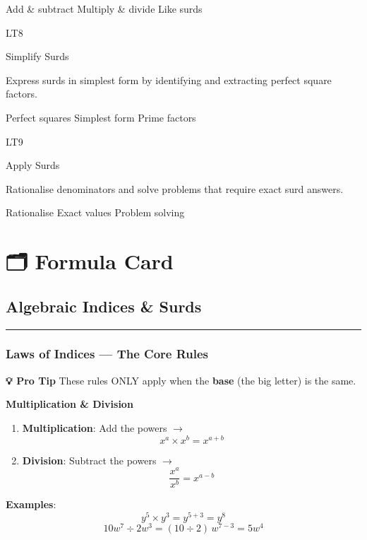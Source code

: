 \documentclass[
  letterpaper,
  DIV=11,
  numbers=noendperiod]{scrreprt}
\providecommand{\tightlist}{%
  \setlength{\itemsep}{0pt}\setlength{\parskip}{0pt}}
\theoremstyle{definition}
\theoremstyle{remark}
\begin{document}
{Add \& subtract} {Multiply \& divide} {Like surds}

LT8

Simplify Surds

Express surds in simplest form by identifying and extracting perfect
square factors.

{Perfect squares} {Simplest form} {Prime factors}

LT9

Apply Surds

Rationalise denominators and solve problems that require exact surd
answers.

{Rationalise} {Exact values} {Problem solving}

\section{🗂️ Formula Card}\label{formula-card}

\subsection*{Algebraic Indices \& Surds}\label{algebraic-indices-surds}

\begin{center}\rule{0.5\linewidth}{0.5pt}\end{center}

\subsubsection*{Laws of Indices --- The Core
Rules}\label{laws-of-indices-the-core-rules}

\textbf{💡 Pro Tip} These rules ONLY apply when the \textbf{base} (the
big letter) is the same.

\textbf{Multiplication \& Division}

\begin{enumerate}
\def\labelenumi{\arabic{enumi}.}
\tightlist
\item
  \textbf{Multiplication}: Add the powers \(\rightarrow\)
  \[x^a \times x^b = x^{a+b}\]
\item
  \textbf{Division}: Subtract the powers \(\rightarrow\)
  \[\frac{x^a}{x^b} = x^{a-b}\]
\end{enumerate}

\textbf{Examples}: \[y^5 \times y^3 = y^{5+3} = y^8\]
\[10w^7 \div 2w^3 = (10 \div 2)\,w^{7-3} = 5w^4\]
\end{document}
